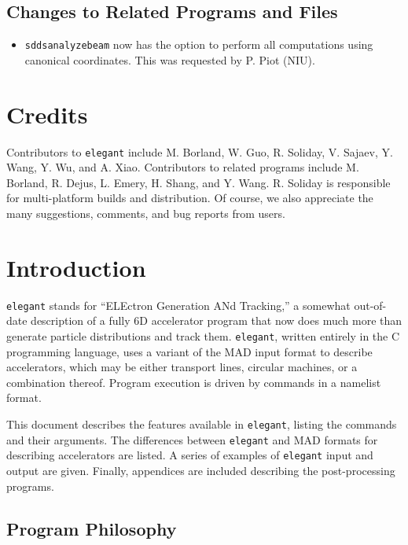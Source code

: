 \documentclass[11pt]{article}
\begin{document}
\subsection{Changes to Related Programs and Files}

\begin{itemize}
\item {\tt sddsanalyzebeam} now has the option to perform all computations using canonical coordinates.
  This was requested by P. Piot (NIU).
\end{itemize}

\section{Credits}

Contributors to {\tt elegant} include M. Borland, W. Guo, R. Soliday, V. Sajaev, Y. Wang, Y. Wu, and A. Xiao.
Contributors to related programs include M. Borland, R. Dejus, L. Emery, H. Shang, and Y. Wang.
R. Soliday is responsible for multi-platform builds and distribution.
Of course, we also appreciate the many suggestions, comments, and bug reports from users.

\section{Introduction}

{\tt elegant} stands for ``ELEctron Generation ANd Tracking,'' a
somewhat out-of-date description of a fully 6D accelerator program
that now does much more than generate particle distributions and track
them.  {\tt elegant}, written entirely in the C programming
language\cite{Kernighan}, uses a variant of the MAD\cite{MAD} input
format to describe accelerators, which may be either transport lines,
circular machines, or a combination thereof.  Program execution is
driven by commands in a namelist format.

This document describes the features available in {\tt elegant},
listing the commands and their arguments.  The differences between
{\tt elegant} and MAD formats for describing accelerators are listed.
A series of examples of {\tt elegant} input and output are given.
Finally, appendices are included describing the post-processing
programs.

\subsection{Program Philosophy}
\end{document}
